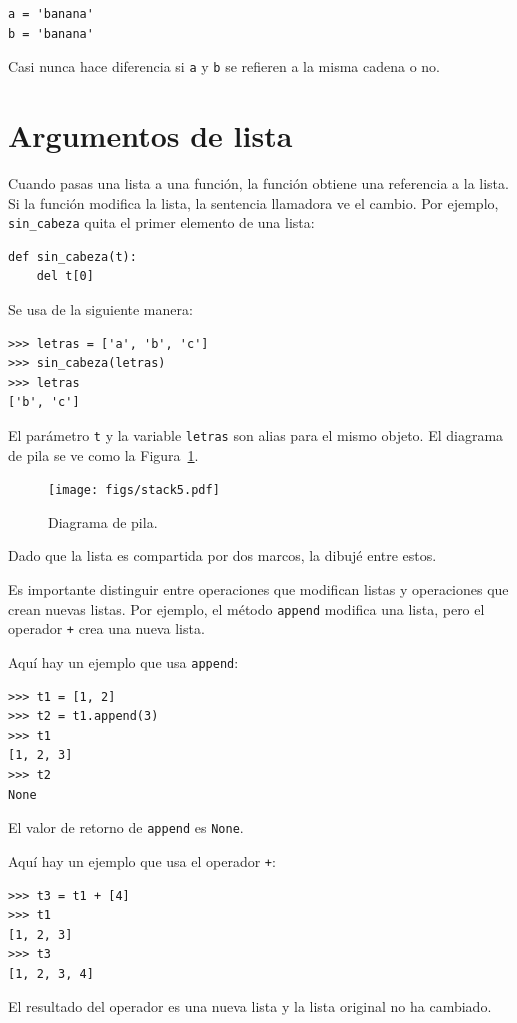 \documentclass[10pt]{book}
\begin{document}
\begin{verbatim}
a = 'banana'
b = 'banana'
\end{verbatim}
%
Casi nunca hace diferencia si {\tt a} y {\tt b} se refieren
a la misma cadena o no.


\section{Argumentos de lista}
\label{list.arguments}

Cuando pasas una lista a una función, la función obtiene una referencia a
la lista.  Si la función modifica la lista, la sentencia llamadora ve
el cambio.  Por ejemplo, \verb"sin_cabeza" quita el primer elemento
de una lista:

\begin{verbatim}
def sin_cabeza(t):
    del t[0]
\end{verbatim}
%
Se usa de la siguiente manera:

\begin{verbatim}
>>> letras = ['a', 'b', 'c']
>>> sin_cabeza(letras)
>>> letras
['b', 'c']
\end{verbatim}
%
El parámetro {\tt t} y la variable {\tt letras} son
alias para el mismo objeto.  El diagrama de pila se ve como la
Figura~\ref{fig.stack5}.

\begin{figure}
\centerline
{\texttt{[image: figs/stack5.pdf]}}
\caption{Diagrama de pila.}
\label{fig.stack5}
\end{figure}

Dado que la lista es compartida por dos marcos, la dibujé
entre estos.

Es importante distinguir entre operaciones que
modifican listas y operaciones que crean nuevas listas.  Por
ejemplo, el método {\tt append} modifica una lista, pero el
operador {\tt +} crea una nueva lista.

Aquí hay un ejemplo que usa {\tt append}:
%
\begin{verbatim}
>>> t1 = [1, 2]
>>> t2 = t1.append(3)
>>> t1
[1, 2, 3]
>>> t2
None
\end{verbatim}
%
El valor de retorno de {\tt append} es {\tt None}.

Aquí hay un ejemplo que usa el operador {\tt +}:
%
\begin{verbatim}
>>> t3 = t1 + [4]
>>> t1
[1, 2, 3]
>>> t3
[1, 2, 3, 4]
\end{verbatim}
%
El resultado del operador es una nueva lista y la lista original no ha
cambiado.
\end{document}
